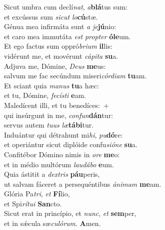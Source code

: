 \evenverse Sicut umbra cum declí\textit{nat}, \textit{a}\textbf{blá}tus sum:~\*\\
\evenverse et excússus sum \textit{si}\textit{cut} \textit{lo}\textbf{cú}stæ.\\
\oddverse Génua mea infirmáta sunt \textit{a} \textit{je}\textbf{jú}nio:~\*\\
\oddverse et caro mea immutáta \textit{est} \textit{prop}\textit{ter} \textbf{ó}\textbf{le}um.\\
\evenverse Et ego factus sum oppró\textit{bri}\textit{um} \textbf{il}lis:~\*\\
\evenverse vidérunt me, et movérunt \textit{cá}\textit{pi}\textit{ta} \textbf{su}a.\\
\oddverse Adjuva me, Dómine, \textit{De}\textit{us} \textbf{me}us:~\*\\
\oddverse salvum me fac secúndum miseri\textit{cór}\textit{di}\textit{am} \textbf{tu}am.\\
\evenverse Et sciant quia \textit{ma}\textit{nus} \textbf{tu}a hæc:~\*\\
\evenverse et tu, Dómine, \textit{fe}\textit{cí}\textit{sti} \textbf{e}am.\\
\oddverse Maledícent illi, et tu benedíces:~+\\
\oddverse  qui insúrgunt in me, \textit{con}\textit{fun}\textbf{dán}tur:~\*\\
\oddverse servus autem \textit{tu}\textit{us} \textit{læ}\textbf{tá}\textbf{bi}tur.\\
\evenverse Induántur qui détrahunt mi\textit{hi}, \textit{pu}\textbf{dó}re:~\*\\
\evenverse et operiántur sicut diplóide confu\textit{si}\textit{ó}\textit{ne} \textbf{su}a.\\
\oddverse Confitébor Dómino nimis in \textit{o}\textit{re} \textbf{me}o:~\*\\
\oddverse et in médio multórum \textit{lau}\textit{dá}\textit{bo} \textbf{e}um.\\
\evenverse Quia ástitit a \textit{dex}\textit{tris} \textbf{páu}peris,~\*\\
\evenverse ut salvam fáceret a persequéntibus \textit{á}\textit{ni}\textit{mam} \textbf{me}am.\\
\oddverse Glória Pa\textit{tri}, \textit{et} \textbf{Fí}lio,~\*\\
\oddverse et Spi\textit{rí}\textit{tu}\textit{i} \textbf{San}cto.\\
\evenverse Sicut erat in princípio, et \textit{nunc}, \textit{et} \textbf{sem}per,~\*\\
\evenverse et in sǽcula sæ\textit{cu}\textit{ló}\textit{rum}. \textbf{A}men.\\
